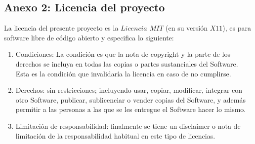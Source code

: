 \subsection{Anexo 2: Licencia del proyecto}\label{anexo2:license}
La licencia del presente proyecto es la \(Licencia\) \(MIT\) (en su versión \(X11\)), es para software libre de código abierto y especifica lo siguiente:
\begin{enumerate}
	\item Condiciones: La condición es que la nota de copyright y la parte de los derechos se incluya en todas las copias o partes sustanciales del Software. Esta es la condición que invalidaría la licencia en caso de no cumplirse.
	\item Derechos: sin restricciones; incluyendo usar, copiar, modificar, integrar con otro Software, publicar, sublicenciar o vender copias del Software, y además permitir a las personas a las que se les entregue el Software hacer lo mismo.
	\item Limitación de responsabilidad: finalmente se tiene un disclaimer o nota de limitación de la responsabilidad habitual en este tipo de licencias.
\end{enumerate}

